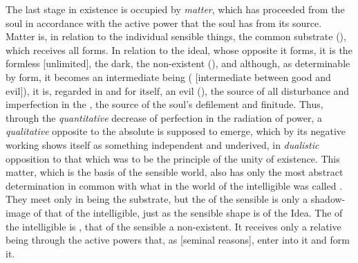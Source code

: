 The last stage in existence is occupied by \emph{matter},
which has proceeded from the soul in accordance with the active power
that the soul has from its source. Matter is, in relation to the
individual sensible things, the common substrate (),
which receives all forms. In relation to the ideal, whose opposite it
forms, it is the formless  [unlimited], the dark, the non-existent
(), and although, as determinable by form, it becomes an
intermediate being ( [intermediate between good and evil]),
it is, regarded in and for itself, an evil (), the source of all
disturbance and imperfection in the , the source of the
soul's defilement and finitude. Thus, through the \emph{quantitative}
decrease of perfection in the radiation of power, a \emph{qualitative}
opposite to the absolute is supposed to emerge, which by its negative
working shows itself as something independent and underived, in
\emph{dualistic} opposition to that which was to be the principle of
the unity of existence. This matter, which is the basis of the sensible
world, also has only the most abstract determination in common with
what in the world of the intelligible was called . They meet only
in being the substrate, but the  of the sensible is only a
shadow-image of that of the intelligible, just as the sensible shape is
of the Idea. The  of the intelligible is , that of the
sensible a non-existent. It receives only a relative being through the
active powers that, as  [seminal reasons], enter into it and
form it.

